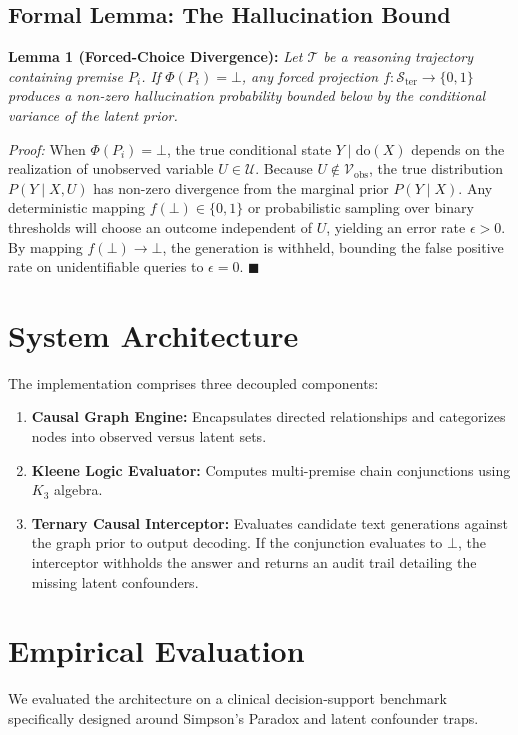 \documentclass[conference]{IEEEtran}
\begin{document}
\subsection{Formal Lemma: The Hallucination Bound}
\textbf{Lemma 1 (Forced-Choice Divergence):} \textit{Let $\mathcal{T}$ be a reasoning trajectory containing premise $P_i$. If $\Phi(P_i) = \bot$, any forced projection $f: \mathcal{S}_{\text{ter}} \to \{0, 1\}$ produces a non-zero hallucination probability bounded below by the conditional variance of the latent prior.}

\textit{Proof:} When $\Phi(P_i) = \bot$, the true conditional state $Y \mid \text{do}(X)$ depends on the realization of unobserved variable $U \in \mathcal{U}$. Because $U \notin \mathcal{V}_{\text{obs}}$, the true distribution $P(Y \mid X, U)$ has non-zero divergence from the marginal prior $P(Y \mid X)$. Any deterministic mapping $f(\bot) \in \{0, 1\}$ or probabilistic sampling over binary thresholds will choose an outcome independent of $U$, yielding an error rate $\epsilon > 0$. By mapping $f(\bot) \to \bot$, the generation is withheld, bounding the false positive rate on unidentifiable queries to $\epsilon = 0$. $\blacksquare$

\section{System Architecture}
The implementation comprises three decoupled components:
\begin{enumerate}
    \item \textbf{Causal Graph Engine:} Encapsulates directed relationships and categorizes nodes into observed versus latent sets.
    \item \textbf{Kleene Logic Evaluator:} Computes multi-premise chain conjunctions using $K_3$ algebra.
    \item \textbf{Ternary Causal Interceptor:} Evaluates candidate text generations against the graph prior to output decoding. If the conjunction evaluates to $\bot$, the interceptor withholds the answer and returns an audit trail detailing the missing latent confounders.
\end{enumerate}

\section{Empirical Evaluation}
We evaluated the architecture on a clinical decision-support benchmark specifically designed around Simpson's Paradox and latent confounder traps.
\end{document}
